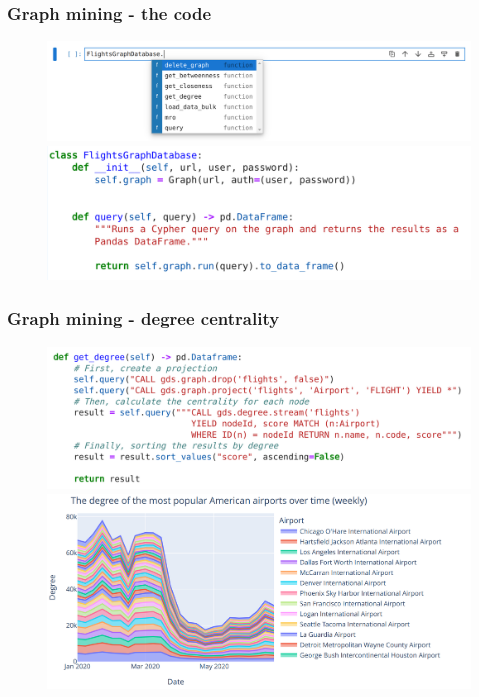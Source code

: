 \documentclass{beamer}
\begin{document}
\begin{frame}
\frametitle{Graph mining - the code}

\begin{figure}
\centering
\includegraphics[width=0.8\linewidth]{../visualizations/graph_class_methods.png}
\vfill
\includegraphics[width=0.8\linewidth]{../visualizations/graph_class_code.png}
\end{figure}

\end{frame}


\begin{frame}
\frametitle{Graph mining - degree centrality}

\begin{figure}
\centering
\includegraphics[width=0.6\linewidth]{../visualizations/get_degree_code.png}
\vfill
\includegraphics[width=0.6\linewidth]{../visualizations/degree_screenshot.png}
\end{figure}

\end{frame}
\end{document}

